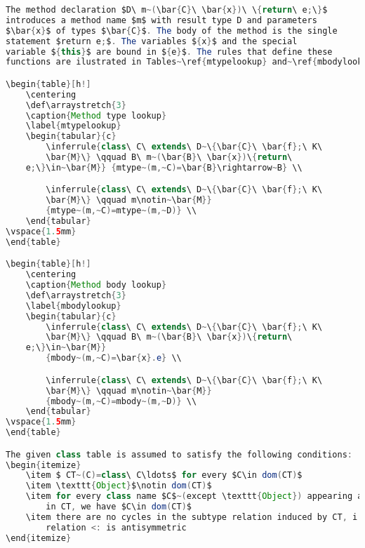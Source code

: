 \begin{lstlisting}[language=Java]
The method declaration $D\ m~(\bar{C}\ \bar{x})\ \{return\ e;\}$
introduces a method name $m$ with result type D and parameters
$\bar{x}$ of types $\bar{C}$. The body of the method is the single
statement $return e;$. The variables ${x}$ and the special
variable ${this}$ are bound in ${e}$. The rules that define these
functions are ilustrated in Tables~\ref{mtypelookup} and~\ref{mbodylookup}.

\begin{table}[h!]
	\centering
	\def\arraystretch{3}
    \caption{Method type lookup}
    \label{mtypelookup}
	\begin{tabular}{c}
		\inferrule{class\ C\ extends\ D~\{\bar{C}\ \bar{f};\ K\
		\bar{M}\} \qquad B\ m~(\bar{B}\ \bar{x})\{return\
	e;\}\in~\bar{M}} {mtype~(m,~C)=\bar{B}\rightarrow~B} \\

		\inferrule{class\ C\ extends\ D~\{\bar{C}\ \bar{f};\ K\
		\bar{M}\} \qquad m\notin~\bar{M}}
		{mtype~(m,~C)=mtype~(m,~D)} \\
	\end{tabular}
\vspace{1.5mm}
\end{table}

\begin{table}[h!]
	\centering
    \caption{Method body lookup}
	\def\arraystretch{3}
    \label{mbodylookup}
	\begin{tabular}{c}
		\inferrule{class\ C\ extends\ D~\{\bar{C}\ \bar{f};\ K\
		\bar{M}\} \qquad B\ m~(\bar{B}\ \bar{x})\{return\
	e;\}\in~\bar{M}}
		{mbody~(m,~C)=\bar{x}.e} \\

		\inferrule{class\ C\ extends\ D~\{\bar{C}\ \bar{f};\ K\
		\bar{M}\} \qquad m\notin~\bar{M}}
		{mbody~(m,~C)=mbody~(m,~D)} \\
	\end{tabular}
\vspace{1.5mm}
\end{table}

The given class table is assumed to satisfy the following conditions:
\begin{itemize}
	\item $ CT~(C)=class\ C\ldots$ for every $C\in dom(CT)$
	\item \texttt{Object}$\notin dom(CT)$
	\item for every class name $C$~(except \texttt{Object}) appearing anywhere
		in CT, we have $C\in dom(CT)$
	\item there are no cycles in the subtype relation induced by CT, i.e., the
		relation <: is antisymmetric
\end{itemize}


\end{lstlisting}
